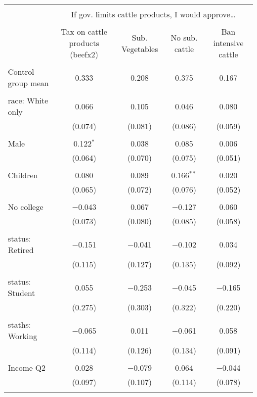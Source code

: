 
\begin{tabular}{@{\extracolsep{5pt}}lcccc} 
\\[-1.8ex]\hline 
\hline \\[-1.8ex] 
 & \multicolumn{4}{c}{If gov. limits cattle products, I would approve…} \\ 
\cline{2-5} 
\\[-1.8ex] & Tax on cattle products (beefx2) & Sub. Vegetables & No sub. cattle & Ban intensive cattle \\ 
\hline \\[-1.8ex] 
 Control group mean & 0.333 & 0.208 & 0.375 & 0.167  \\ \hline \\[-1.8ex] race: White only & 0.066 & 0.105 & 0.046 & 0.080 \\ 
  & (0.074) & (0.081) & (0.086) & (0.059) \\ 
  & & & & \\ 
 Male & 0.122$^{*}$ & 0.038 & 0.085 & 0.006 \\ 
  & (0.064) & (0.070) & (0.075) & (0.051) \\ 
  & & & & \\ 
 Children & 0.080 & 0.089 & 0.166$^{**}$ & 0.020 \\ 
  & (0.065) & (0.072) & (0.076) & (0.052) \\ 
  & & & & \\ 
 No college & $-$0.043 & 0.067 & $-$0.127 & 0.060 \\ 
  & (0.073) & (0.080) & (0.085) & (0.058) \\ 
  & & & & \\ 
 status: Retired & $-$0.151 & $-$0.041 & $-$0.102 & 0.034 \\ 
  & (0.115) & (0.127) & (0.135) & (0.092) \\ 
  & & & & \\ 
 status: Student & 0.055 & $-$0.253 & $-$0.045 & $-$0.165 \\ 
  & (0.275) & (0.303) & (0.322) & (0.220) \\ 
  & & & & \\ 
 staths: Working & $-$0.065 & 0.011 & $-$0.061 & 0.058 \\ 
  & (0.114) & (0.126) & (0.134) & (0.091) \\ 
  & & & & \\ 
 Income Q2 & 0.028 & $-$0.079 & 0.064 & $-$0.044 \\ 
  & (0.097) & (0.107) & (0.114) & (0.078) \\ 
  & & & & \\ 

\end{tabular}
